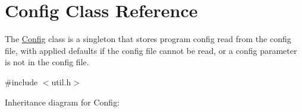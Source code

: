 \hypertarget{classConfig}{}\section{Config Class Reference}
\label{classConfig}


The \mbox{\hyperlink{classConfig}{Config}} class is a singleton that stores program config read from the config file, with applied defaults if the config file cannot be read, or a config parameter is not in the config file.  




{\ttfamily \#include $<$util.\+h$>$}



Inheritance diagram for Config\+:
